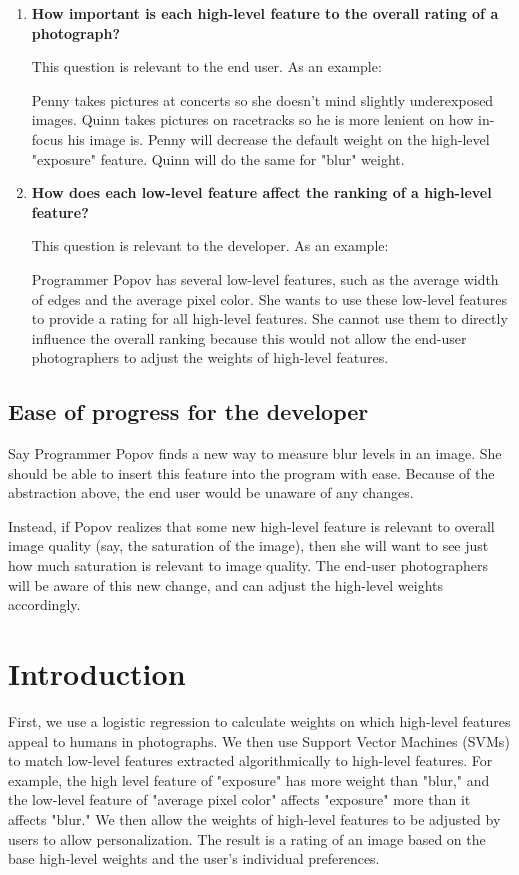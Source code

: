 \documentclass[10pt,twocolumn]{article}
\begin{document}
\begin{enumerate}
\item \textbf{How important is each high-level feature to the overall rating of a photograph?}

This question is relevant to the end user. As an example:

Penny takes pictures at concerts so she doesn't mind slightly underexposed images. Quinn takes pictures on racetracks so he is more lenient on how in-focus his image is. Penny will decrease the default weight on the high-level "exposure" feature. Quinn will do the same for "blur" weight.

\item \textbf{How does each low-level feature affect the ranking of a high-level feature?}

This  question is relevant to the developer. As an example:

Programmer Popov has several low-level features, such as the average width of edges and the average pixel color. She wants to use these low-level features to provide a rating for all high-level features. She cannot use them to directly influence the overall ranking because this would not allow the end-user photographers to adjust the weights of high-level features.
\end{enumerate}

\subsection{Ease of progress for the developer}
Say Programmer Popov finds a new way to measure blur levels in an image. She should be able to insert this feature into the program with ease. Because of the abstraction above, the end user would be unaware of any changes.

Instead, if Popov realizes that some new high-level feature is relevant to overall image quality (say, the saturation of the image), then she will want to see just how much saturation is relevant to image quality. The end-user photographers will be aware of this new change, and can adjust the high-level weights accordingly.

\section{Introduction}
First, we use a logistic regression to calculate weights on which high-level features appeal to humans in photographs. We then use Support Vector Machines (SVMs) to match low-level features extracted algorithmically to high-level features. For example, the high level feature of "exposure" has more weight than "blur," and the low-level feature of "average pixel color" affects "exposure" more than it affects "blur." We then allow the weights of high-level features to be adjusted by users to allow personalization. The result is a rating of an image based on the base high-level weights and the user's individual preferences.
\end{document}
